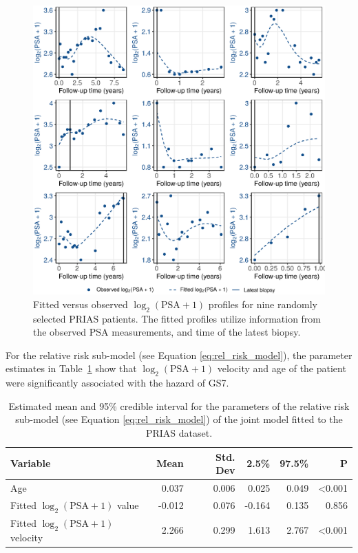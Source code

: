 \begin{figure}
\centerline{\includegraphics[width=\columnwidth]{images/fitted_9subject_psa.eps}}
\caption{Fitted versus observed ${\log_2 (\mbox{PSA} + 1)}$ profiles for nine randomly selected PRIAS patients. The fitted profiles utilize information from the observed PSA measurements, and time of the latest biopsy.}
\label{fig:fitted_9subject_psa}
\end{figure}

For the relative risk sub-model (see Equation \ref{eq:rel_risk_model}), the parameter estimates in Table~\ref{tab:PSA_survival} show that ${\log_2 (\mbox{PSA} + 1)}$ velocity and age of the patient were significantly associated with the hazard of GS7.

\begin{table}[!htb]
\small\sf\centering
\caption{Estimated mean and 95\% credible interval for the parameters of the relative risk sub-model (see Equation \ref{eq:rel_risk_model}) of the joint model fitted to the PRIAS dataset.}
\label{tab:PSA_survival}
\begin{tabular}{lrrrrr}
\hline
Variable                      & Mean   & Std. Dev & 2.5\%  & 97.5\%                 & P              \\
\hline
Age                      & 0.037    & 0.006 & 0.025  & 0.049  & \textless0.001 \\
Fitted $\log_2 (\mbox{PSA} + 1)$ value            & -0.012   & 0.076 & -0.164 & 0.135  & 0.856 \\
Fitted $\log_2 (\mbox{PSA} + 1)$ velocity             & 2.266    & 0.299 & 1.613  & 2.767  & \textless0.001   \\
\hline
\end{tabular}
\end{table}

